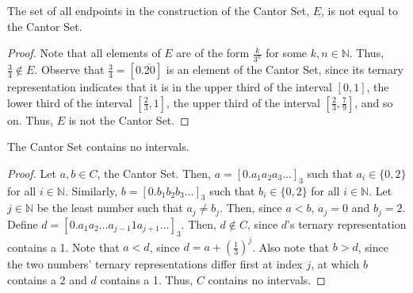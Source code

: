 \documentclass[12pt]{article}
\begin{document}
\newpage
{} The set of all endpoints in the construction of the Cantor Set, $E$, is not equal to the Cantor Set.
\begin{proof}
    Note that all elements of $E$ are of the form $\frac k{3^n}$ for some $k,n \in \mathbb N$. Thus, $\frac34\notin E$. Observe that $\frac34 = [0.\overline{20}]$ is an element of the Cantor Set, since its ternary representation indicates that it is in the upper third of the interval $[0,1]$, the lower third of the interval $[\frac23,1]$, the upper third of the interval $[\frac23, \frac79]$, and so on. Thus, $E$ is not the Cantor Set.
\end{proof}

\newpage
{} The Cantor Set contains no intervals.
\begin{proof}
    Let $a, b \in C$, the Cantor Set. Then, $a = [0.a_1a_2a_3\hdots]_3$ such that $a_i \in \{0,2\}$ for all $i \in \mathbb N$. Similarly, $b = [0.b_1b_2b_3\hdots]_3$ such that $b_i \in \{0,2\}$ for all $i \in \mathbb N$. Let $j \in \mathbb N$ be the least number such that $a_j \neq b_j$. Then, since $a < b$, $a_j = 0$ and $b_j = 2$. Define $d = [0.a_1a_2 \hdots a_{j-1}1a_{j+1}\hdots]_3$. Then, $d \notin C$, since $d$'s ternary representation contains a 1. Note that $a < d$, since $d = a + \left(\frac13\right)^j$. Also note that $b > d$, since the two numbers' ternary representations differ first at index $j$, at which $b$ contains a 2 and $d$ contains a 1. Thus, $C$ contains no intervals.
\end{proof}
\end{document}
